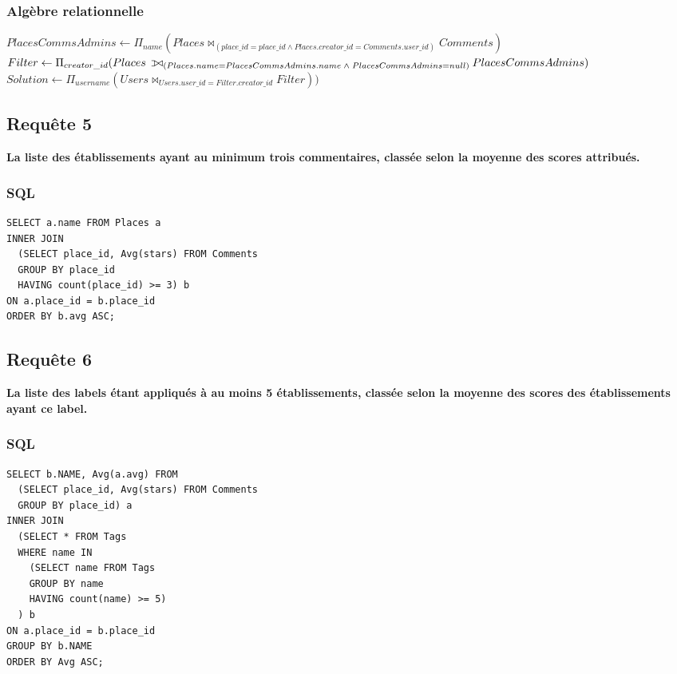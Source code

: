 \documentclass[a4paper,10pt]{article}
\def\ojoin{\setbox0=\hbox{$\bowtie$}%
  \rule[-.02ex]{.25em}{.4pt}\llap{\rule[\ht0]{.25em}{.4pt}}}
\def\leftouterjoin{\mathbin{\ojoin\mkern-5.8mu\bowtie}}
\begin{document}
\subsubsection{Algèbre relationnelle}

\hspace{-0.30cm}$ PlacesCommsAdmins \leftarrow \Pi_{name} (Places \bowtie_{(place\_id = place\_id \wedge Places.creator\_id = Comments.user\_id)} Comments ) $ \\

\hspace{-0.30cm}$ Filter \leftarrow \Pi_{creator\_id} (Places \;\leftouterjoin_{(Places.name = PlacesCommsAdmins.name\; \wedge\; PlacesCommsAdmins = null) } PlacesCommsAdmins)$ \\

\hspace{-0.30cm}$ Solution \leftarrow \Pi_{username} (Users \bowtie_{Users.user\_id = Filter.creator\_id} Filter))$

\newpage

\subsection{Requête 5}

\textbf{La liste des établissements ayant au minimum trois commentaires, classée selon la moyenne des scores attribués.}

\subsubsection{SQL}

\begin{verbatim}
SELECT a.name FROM Places a
INNER JOIN 
  (SELECT place_id, Avg(stars) FROM Comments
  GROUP BY place_id
  HAVING count(place_id) >= 3) b
ON a.place_id = b.place_id
ORDER BY b.avg ASC;
\end{verbatim}

\subsection{Requête 6}

\textbf{La liste des labels étant appliqués à au moins 5 établissements, classée selon la moyenne des scores des établissements ayant ce label.}

\subsubsection{SQL}

\begin{verbatim}
SELECT b.NAME, Avg(a.avg) FROM 
  (SELECT place_id, Avg(stars) FROM Comments
  GROUP BY place_id) a
INNER JOIN
  (SELECT * FROM Tags
  WHERE name IN 
    (SELECT name FROM Tags
    GROUP BY name
    HAVING count(name) >= 5)
  ) b
ON a.place_id = b.place_id
GROUP BY b.NAME
ORDER BY Avg ASC; 
\end{verbatim}
\end{document}
